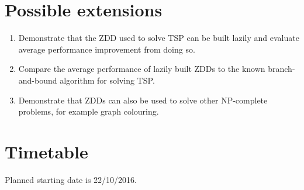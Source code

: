 \documentclass[12pt,a4paper,twoside]{article}
\begin{document}
\section*{Possible extensions}

\begin{enumerate}

\item Demonstrate that the ZDD used to solve TSP can be built lazily and evaluate average performance improvement from doing so.

\item Compare the average performance of lazily built ZDDs to the known branch-and-bound algorithm for solving TSP.

\item Demonstrate that ZDDs can also be used to solve other NP-complete problems, for example graph colouring.

\end{enumerate}

\section*{Timetable}

Planned starting date is 22/10/2016.
\end{document}
